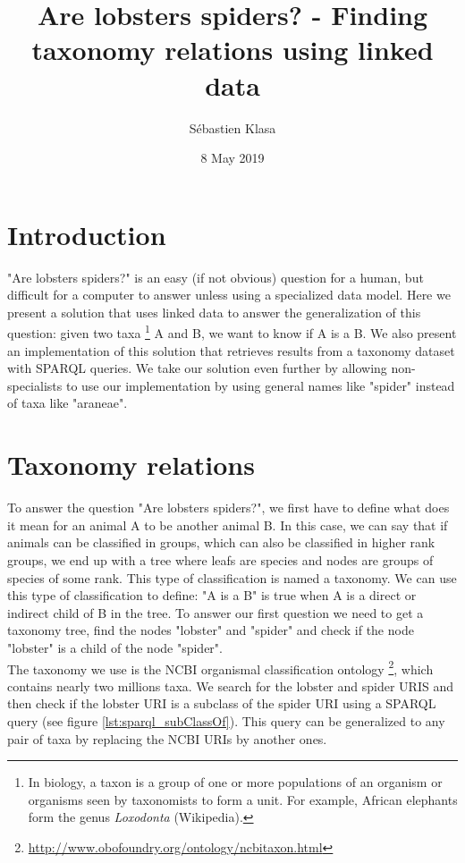 \documentclass{article}
\title{Are lobsters spiders? - Finding taxonomy relations using linked data}
\author{Sébastien Klasa}
\date{8 May 2019}
\begin{document}
\maketitle

\section{Introduction}

"Are lobsters spiders?" is an easy (if not obvious) question for a human, but difficult for a computer to answer unless using a specialized data model. Here we present a solution that uses linked data to answer the generalization of this question: given two taxa \footnote{In biology, a taxon is a group of one or more populations of an organism or organisms seen by taxonomists to form a unit. For example, African elephants form the genus \textit{Loxodonta} (Wikipedia).} A and B, we want to know if A is a B. We also present an implementation of this solution that retrieves results from a taxonomy dataset with SPARQL queries. We take our solution even further by allowing non-specialists to use our implementation by using general names like "spider" instead of taxa like "araneae".

\section{Taxonomy relations}
\label{sec:taxonomy_relations}

To answer the question "Are lobsters spiders?", we first have to define what does it mean for an animal A to be another animal B. In this case, we can say that if animals can be classified in groups, which can also be classified in higher rank groups, we end up with a tree where leafs are species and nodes are groups of species of some rank. This type of classification is named a taxonomy. We can use this type of classification to define: "A is a B" is true when A is a direct or indirect child of B in the tree. To answer our first question we need to get a taxonomy tree, find the nodes "lobster" and "spider" and check if the node "lobster" is a child of the node "spider".
\\

The taxonomy we use is the NCBI organismal classification ontology \footnote{\url{http://www.obofoundry.org/ontology/ncbitaxon.html}}, which contains nearly two millions taxa. We search for the lobster and spider URIS and then check if the lobster URI is a subclass of the spider URI using a SPARQL query (see figure \ref{lst:sparql_subClassOf}). This query can be generalized to any pair of taxa by replacing the NCBI URIs by another ones.
\end{document}
